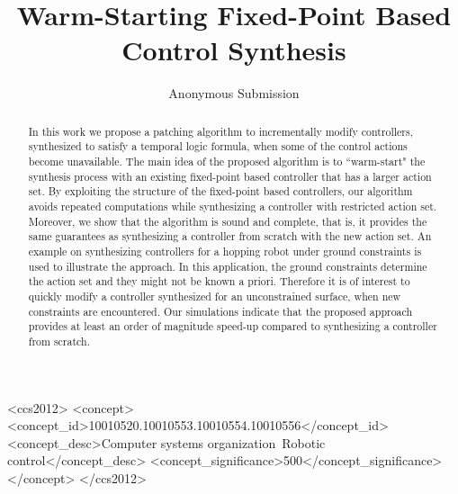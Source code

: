 \documentclass[sigconf]{acmart}
\begin{document}
\title{Warm-Starting {\color{purple} Fixed-Point} Based Control Synthesis}


\author{Anonymous Submission}

\renewcommand{\shortauthors}{Anonymous et al.}


\begin{abstract}
 In this work we propose a patching algorithm to incrementally modify controllers, synthesized to satisfy a temporal logic formula, when some of the control actions become unavailable. The main idea of the proposed algorithm is to ``warm-start" the synthesis process with an existing fixed-point based controller that has a larger action set. 
By exploiting the structure of the fixed-point based controllers, our algorithm avoids repeated computations while synthesizing a controller with restricted action set. Moreover, we show that the algorithm is sound and complete, that is, it provides the same guarantees as synthesizing a controller from scratch with the new action set.    
An example on synthesizing controllers for a hopping robot under ground constraints is used to illustrate the approach. In this application, the ground constraints determine the action set and they might not be known a priori. Therefore it is of interest to quickly modify a controller synthesized for an unconstrained surface, when new constraints are encountered. Our simulations indicate that the proposed approach provides at least an order of magnitude speed-up compared to synthesizing a controller from scratch.
\end{abstract}

%
%
\begin{CCSXML}
<ccs2012>
<concept>
<concept_id>10010520.10010553.10010554.10010556</concept_id>
<concept_desc>Computer systems organization~Robotic control</concept_desc>
<concept_significance>500</concept_significance>
</concept>
</ccs2012>
\end{CCSXML}






\maketitle





\end{document}
